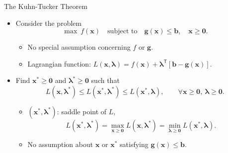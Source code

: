 \documentclass[aspectratio=169,hyperref,UTF8,CJK]{beamer}
\newcommand{\trans}{\mathsf{T}}
\newcommand{\vect}[1]{\boldsymbol{#1}}
\begin{document}
\begin{frame}{The Kuhn-Tucker Theorem}
  \scriptsize
  \begin{itemize}
    \item Consider the problem
      \begin{equation}\tag{16}
        \max\ f(\vect{x})\quad\text{subject to}\quad
        \vect{g}(\vect{x})\le\vect{b},\quad\vect{x}\ge\vect{0}.
      \end{equation}
      \begin{itemize}
        \item No special assumption concerning $f$ or $\vect{g}$.
        \item Lagrangian function: $L(\vect{x},\vect{\lambda})=f(\vect{x})+\vect{\lambda}^{\trans}[\vect{b}-\vect{g}(\vect{x})]$.
      \end{itemize}
    \item Find $\vect{x}^{*}\ge\vect{0}$ and $\vect{\lambda}^{*}\ge\vect{0}$ such that
      \begin{equation}\tag{17}
        L(\vect{x},\vect{\lambda}^{*})\le
        L(\vect{x}^{*},\vect{\lambda}^{*})\le
        L(\vect{x}^{*},\vect{\lambda}),
        \qquad\forall\vect{x}\ge\vect{0},\ \vect{\lambda}\ge\vect{0}.
      \end{equation}
      \begin{itemize}
        \item $(\vect{x}^{*},\vect{\lambda}^{*})$: saddle point of $L$,
          \begin{equation*}
            L(\vect{x}^{*},\vect{\lambda}^{*})=
            \max_{\vect{x}\ge\vect{0}}L(\vect{x},\vect{\lambda}^{*})=
            \min_{\vect{\lambda}\ge\vect{0}}L(\vect{x}^{*},\vect{\lambda}).
          \end{equation*}
        \item No assumption about $\vect{x}$ or $\vect{x}^{*}$ satisfying $\vect{g}(\vect{x})\le\vect{b}$.
      \end{itemize}
  \end{itemize}
\end{frame}
\end{document}
